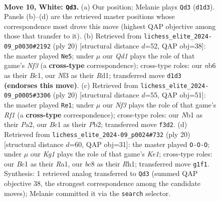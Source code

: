 \documentclass[11pt]{article}
\begin{document}
\clearpage

\begin{figure}[p]\centering
\begin{subfigure}{0.46\textwidth}\centering
\resizebox{\linewidth}{!}{%
\newchessgame
\chessboard[
  setfen={rnbq1rk1/pp3pbp/1n1pp1p1/8/3P4/1B3N2/PPP2PPP/RNBQR1K1 w - - 2 10},
  showmover=false,
  pgfstyle=straightmove, color=movearrow, markmove={d1-d3}
]}
\caption{}
\end{subfigure}\hfill
\begin{subfigure}{0.46\textwidth}\centering
\resizebox{\linewidth}{!}{%
\newchessgame
\chessboard[
  setfen={r1bq1rk1/pp3pp1/2pbpn1p/8/2BP4/5N2/PPP1QPPP/R1BR2K1 w - - 2 11},
  showmover=false,
  pgfstyle=straightmove, color=movearrow, markmove={f3-e5}
]}
\caption{}
\end{subfigure}
\\[4pt]
\begin{subfigure}{0.46\textwidth}\centering
\resizebox{\linewidth}{!}{%
\newchessgame
\chessboard[
  setfen={r1bq1rk1/pp1nppbp/6p1/3p4/3P1B2/3B1N2/PPP2PPP/R2Q1RK1 w - - 4 11},
  showmover=false,
  pgfstyle=straightmove, color=movearrow, markmove={f1-e1}
]}
\caption{}
\end{subfigure}\hfill
\begin{subfigure}{0.46\textwidth}\centering
\resizebox{\linewidth}{!}{%
\newchessgame
\chessboard[
  setfen={r1bq1rk1/p1p2pbp/2pp1np1/8/4P3/2NBB2P/PPPQ1PP1/R3K2R w KQ - 1 11},
  showmover=false,
  pgfstyle=straightmove, color=movearrow, markmove={e1-c1}
]}
\caption{}
\end{subfigure}
\caption{\textbf{Move 10, White: \texttt{Qd3}.} (a) Our position; Melanie plays \texttt{Qd3} (\texttt{d1d3}). Panels (b)--(d) are the retrieved master positions whose correspondence most drove this move (highest QAP objective among those that transfer to it). (b) Retrieved from \texttt{lichess\_elite\_2024-09\_p0030\#2192} (ply 20) [structural distance $d$=52, QAP obj=38]: the master played \texttt{Ne5}; under $\mu$ our \emph{Qd1} plays the role of that game's \emph{Nf3} (a \textbf{cross-type} correspondence); cross-type roles: our \emph{n}b6 as their \emph{B}c1, our \emph{N}f3 as their \emph{R}d1; transferred move \texttt{d1d3} \textbf{(endorses this move)}. (c) Retrieved from \texttt{lichess\_elite\_2024-09\_p0005\#3306} (ply 20) [structural distance $d$=55, QAP obj=51]: the master played \texttt{Re1}; under $\mu$ our \emph{Nf3} plays the role of that game's \emph{Rf1} (a \textbf{cross-type} correspondence); cross-type roles: our \emph{N}b1 as their \emph{P}a2, our \emph{B}c1 as their \emph{P}b2; transferred move \texttt{f3d2}. (d) Retrieved from \texttt{lichess\_elite\_2024-09\_p0024\#732} (ply 20) [structural distance $d$=60, QAP obj=31]: the master played \texttt{O-O-O}; under $\mu$ our \emph{Kg1} plays the role of that game's \emph{Ke1}; cross-type roles: our \emph{B}c1 as their \emph{R}a1, our \emph{b}c8 as their \emph{R}h1; transferred move \texttt{g1f1}. Synthesis: 1 retrieved analog transferred to \texttt{Qd3} (summed QAP objective 38, the strongest correspondence among the candidate moves); Melanie committed it via the \texttt{search} selector.}
\label{fig:thought-m18}
\end{figure}
\end{document}
